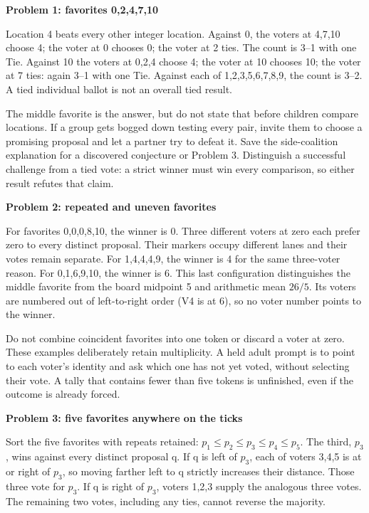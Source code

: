 \documentclass[11pt,letterpaper]{article}
\newcommand{\sub}[1]{\par\textbf{#1}\par}
\begin{document}
\sub{Problem 1: favorites 0,2,4,7,10}
Location 4 beats every other integer location. Against 0, the voters at 4,7,10 choose 4; the voter at 0 chooses 0; the voter at 2 ties. The count is 3--1 with one Tie. Against 10 the voters at 0,2,4 choose 4; the voter at 10 chooses 10; the voter at 7 ties: again 3--1 with one Tie. Against each of 1,2,3,5,6,7,8,9, the count is 3--2. A tied individual ballot is not an overall tied result.

The middle favorite is the answer, but do not state that before children compare locations. If a group gets bogged down testing every pair, invite them to choose a promising proposal and let a partner try to defeat it. Save the side-coalition explanation for a discovered conjecture or Problem 3. Distinguish a successful challenge from a tied vote: a strict winner must win every comparison, so either result refutes that claim.

\sub{Problem 2: repeated and uneven favorites}
For favorites 0,0,0,8,10, the winner is 0. Three different voters at zero each prefer zero to every distinct proposal. Their markers occupy different lanes and their votes remain separate. For 1,4,4,4,9, the winner is 4 for the same three-voter reason. For 0,1,6,9,10, the winner is 6. This last configuration distinguishes the middle favorite from the board midpoint 5 and arithmetic mean $26/5$. Its voters are numbered out of left-to-right order (V4 is at 6), so no voter number points to the winner.

Do not combine coincident favorites into one token or discard a voter at zero. These examples deliberately retain multiplicity. A held adult prompt is to point to each voter's identity and ask which one has not yet voted, without selecting their vote. A tally that contains fewer than five tokens is unfinished, even if the outcome is already forced.

\sub{Problem 3: five favorites anywhere on the ticks}
Sort the five favorites with repeats retained: $p_1\leq p_2\leq p_3\leq p_4\leq p_5$. The third, $p_3$, wins against every distinct proposal q. If q is left of $p_3$, each of voters 3,4,5 is at or right of $p_3$, so moving farther left to q strictly increases their distance. Those three vote for $p_3$. If q is right of $p_3$, voters 1,2,3 supply the analogous three votes. The remaining two votes, including any ties, cannot reverse the majority.
\end{document}
